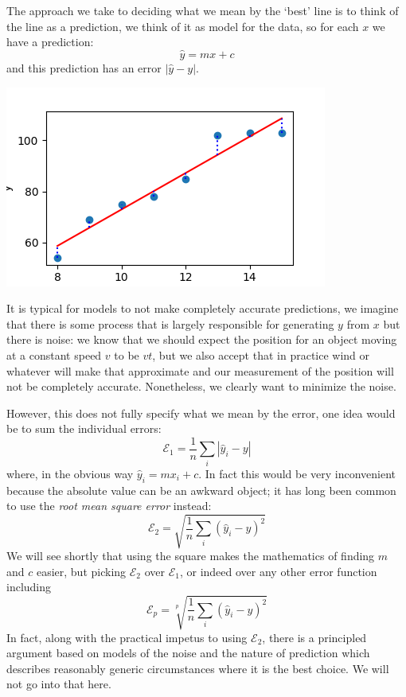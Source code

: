 \documentclass[12pt]{article}
\begin{document}
The approach we take to deciding what we mean by the `best' line is to
think of the line as a prediction, we think of it as model for the
data, so for each $x$ we have a prediction:
\begin{equation}
  \hat{y}=mx+c
\end{equation}
and this prediction has an error $|\hat{y}-y|$.
\begin{center}
  \includegraphics[]{02.3_points_line.png}
  \end{center}
It is typical for models to not make completely accurate predictions,
we imagine that there is some process that is largely responsible for
generating $y$ from $x$ but there is noise: we know that we should
expect the position for an object moving at a constant speed $v$ to be
$vt$, but we also accept that in practice wind or whatever will make
that approximate and our measurement of the position will not be
completely accurate. Nonetheless, we clearly want to minimize the
noise.

However, this does not fully specify what we mean by the error, one
idea would be to sum the individual errors:
\begin{equation}
  \mathcal{E}_1=\frac{1}{n}\sum_i |\hat{y}_i-y|
\end{equation}
where, in the obvious way $\hat{y}_i=mx_i+c$. In fact this would be
very inconvenient because the absolute value can be an awkward object; it has long been common to use the \textsl{root mean square error} instead:
\begin{equation}
  \mathcal{E}_2=\sqrt{\frac{1}{n}\sum_i (\hat{y}_i-y)^2}
\end{equation}
We will see shortly that using the square makes the mathematics of
finding $m$ and $c$ easier, but picking $\mathcal{E}_2$ over
$\mathcal{E}_1$, or indeed over any other error function including
\begin{equation}
  \mathcal{E}_p=\sqrt[p]{\frac{1}{n}\sum_i (\hat{y}_i-y)^2}
\end{equation}
In fact, along with the practical impetus to using $\mathcal{E}_2$,
there is a principled argument based on models of the noise and the
nature of prediction which describes reasonably generic circumstances
where it is the best choice. We will not go into that here.
\end{document}
